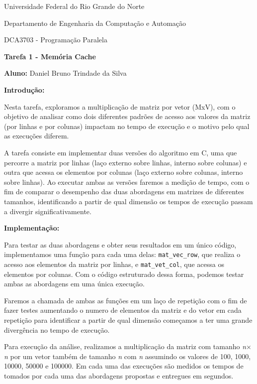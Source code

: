 \documentclass[a4paper, 12pt]{article}
\begin{document}
	\begin{center}
		Universidade Federal do Rio Grande do Norte
		
		Departamento de Engenharia da Computação e Automação
		
		DCA3703 - Programação Paralela
		
		\textbf{Tarefa 1 - Memória Cache}
		
		\textbf{Aluno:} Daniel Bruno Trindade da Silva
	\end{center}
	
	\vspace{1cm}
	
	\textbf{Introdução:}
	
	Nesta tarefa, exploramos a multiplicação de matriz por vetor (MxV), com o objetivo de analisar como dois diferentes padrões de acesso aos valores da matriz (por linhas e por colunas) impactam no tempo de execução e o motivo pelo qual as execuções diferem.
	
	
	A tarefa consiste em implementar duas versões do algoritmo em C, uma que percorre a matriz por linhas (laço externo sobre linhas, interno sobre colunas) e outra que acessa os elementos por colunas (laço externo sobre colunas, interno sobre linhas). Ao executar ambas as versões faremos a medição de tempo, com o fim de comparar o desempenho das duas abordagens em matrizes de diferentes tamanhos, identificando a partir de qual dimensão os tempos de execução passam a divergir significativamente.
	
	\vspace{1cm}
	
	\textbf{Implementação:}
	
	Para testar as duas abordagens e obter seus resultados em um único código, implementamos uma função para cada uma delas: \texttt{mat\_vec\_row}, que realiza o acesso aos elementos da matriz por linhas, e \texttt{mat\_vet\_col}, que acessa os elementos por colunas. Com o código estruturado dessa forma, podemos testar ambas as abordagens em uma única execução.
	
	Faremos a chamada de ambas as funções em um laço de repetição com o fim de fazer testes aumentando o numero de elementos da matriz e do vetor em cada repetição para identificar a partir de qual dimensão começamos a ter uma grande divergência no tempo de execução.
	
	Para execução da análise, realizamos a multiplicação da matriz com tamanho \textit{n$\times$n} por um vetor também de tamanho \textit{n} com \textit{n} assumindo os valores de 100, 1000, 10000, 50000 e 100000. Em cada uma das execuções são medidos os tempos de tomados por cada uma das abordagens propostas e entregues em segundos.
	
\end{document}
